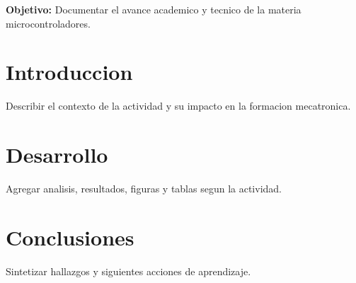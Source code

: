 \documentclass[spanish,letterpaper,oneside]{article}
\begin{document}
\templatePortrait
\templatePagecfg
\onehalfspacing

\begin{abstractd}
\textbf{Objetivo:} Documentar el avance academico y tecnico de la materia microcontroladores.
\end{abstractd}

\templateIndex
\templateFinalcfg

\section{Introduccion}
Describir el contexto de la actividad y su impacto en la formacion mecatronica.

\section{Desarrollo}
Agregar analisis, resultados, figuras y tablas segun la actividad.

\section{Conclusiones}
Sintetizar hallazgos y siguientes acciones de aprendizaje.



\end{document}
